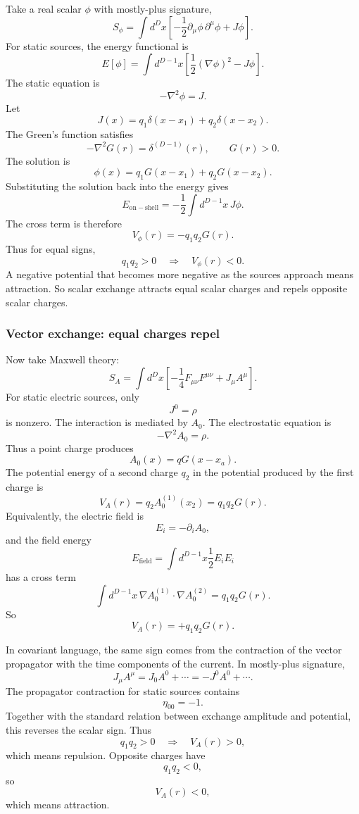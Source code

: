 \documentclass[
  10pt,
  a4paper,
  openany]{book}
\begin{document}
Take a real scalar \(\phi\) with mostly-plus signature, \[
S_\phi
=
\int d^Dx
\left[
-\frac{1}{2}\partial_\mu\phi\,\partial^\mu\phi
+
J\phi
\right].
\] For static sources, the energy functional is \[
E[\phi]
=
\int d^{D-1}x
\left[
\frac{1}{2}(\nabla\phi)^2
-
J\phi
\right].
\] The static equation is \[
-\nabla^2\phi=J.
\] Let \[
J(x)=q_1\delta(x-x_1)+q_2\delta(x-x_2).
\] The Green's function satisfies \[
-\nabla^2G(r)=\delta^{(D-1)}(r),
\qquad
G(r)>0.
\] The solution is \[
\phi(x)
=
q_1G(x-x_1)+q_2G(x-x_2).
\] Substituting the solution back into the energy gives \[
E_{\mathrm{on-shell}}
=
-\frac{1}{2}\int d^{D-1}x\,J\phi.
\] The cross term is therefore \[
V_\phi(r)
=
-q_1q_2G(r).
\] Thus for equal signs, \[
q_1q_2>0
\quad\Longrightarrow\quad
V_\phi(r)<0.
\] A negative potential that becomes more negative as the sources
approach means attraction. So scalar exchange attracts equal scalar
charges and repels opposite scalar charges.

\subsubsection{Vector exchange: equal charges
repel}\label{vector-exchange-equal-charges-repel}

Now take Maxwell theory: \[
S_A
=
\int d^Dx
\left[
-\frac{1}{4}F_{\mu\nu}F^{\mu\nu}
+
J_\mu A^\mu
\right].
\] For static electric sources, only \[
J^0=\rho
\] is nonzero. The interaction is mediated by \(A_0\). The electrostatic
equation is \[
-\nabla^2A_0=\rho.
\] Thus a point charge produces \[
A_0(x)=qG(x-x_a).
\] The potential energy of a second charge \(q_2\) in the potential
produced by the first charge is \[
V_A(r)=q_2A_0^{(1)}(x_2)
=
q_1q_2G(r).
\] Equivalently, the electric field is \[
E_i=-\partial_i A_0,
\] and the field energy \[
E_{\mathrm{field}}
=
\int d^{D-1}x
\frac{1}{2}E_iE_i
\] has a cross term \[
\int d^{D-1}x\,\nabla A_0^{(1)}\cdot\nabla A_0^{(2)}
=
q_1q_2G(r).
\] So \[
V_A(r)
=
+q_1q_2G(r).
\]

In covariant language, the same sign comes from the contraction of the
vector propagator with the time components of the current. In
mostly-plus signature, \[
J_\mu A^\mu
=
J_0A^0+\cdots
=
-J^0A^0+\cdots.
\] The propagator contraction for static sources contains \[
\eta_{00}=-1.
\] Together with the standard relation between exchange amplitude and
potential, this reverses the scalar sign. Thus \[
q_1q_2>0
\quad\Longrightarrow\quad
V_A(r)>0,
\] which means repulsion. Opposite charges have \[
q_1q_2<0,
\] so \[
V_A(r)<0,
\] which means attraction.
\end{document}
